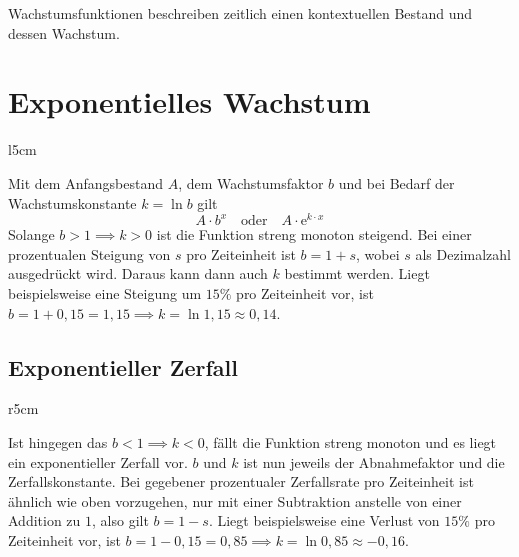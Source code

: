 \documentclass{article}
\begin{document}
\noindent Wachstumsfunktionen beschreiben zeitlich einen kontextuellen Bestand und dessen Wachstum.
\section{Exponentielles Wachstum}
\begin{wrapfigure}{l}{5cm}
  \centering
\end{wrapfigure} 
Mit dem Anfangsbestand $A$, dem Wachstumsfaktor $b$ und bei Bedarf der Wachstumskonstante $k=\ln{b}$ gilt
\[ 
 A \cdot b^x 
 \quad \text{oder} \quad 
 A \cdot \mathrm{e}^{k \cdot x}  
\]
Solange ${b > 1 \implies k > 0}$ ist die Funktion streng monoton steigend. Bei einer prozentualen Steigung von $s$ pro Zeiteinheit ist ${b=1+s}$, wobei $s$ als Dezimalzahl ausgedrückt wird. Daraus kann dann auch $k$ bestimmt werden. \newline
Liegt beispielsweise eine Steigung um $15\%$ pro Zeiteinheit vor, ist ${b=1 + 0,15=1,15 \implies k=\ln{1,15} \approx 0,14}$. 
\newline 
 
\subsection{Exponentieller Zerfall}
\begin{wrapfigure}{r}{5cm}
  \centering
\end{wrapfigure} 
Ist hingegen das $b < 1 \implies k < 0$, fällt die Funktion streng monoton und es liegt ein exponentieller Zerfall vor. $b$ und $k$ ist nun jeweils der Abnahmefaktor und die Zerfallskonstante. Bei gegebener prozentualer Zerfallsrate pro Zeiteinheit ist ähnlich wie oben vorzugehen, nur mit einer Subtraktion anstelle von einer Addition zu $1$, also gilt ${b=1-s}$. \newline
Liegt beispielsweise eine Verlust von $15\%$ pro Zeiteinheit vor, ist ${b=1-0,15=0,85 \implies k=\ln {0,85} \approx -0,16}$.  
\end{document}
